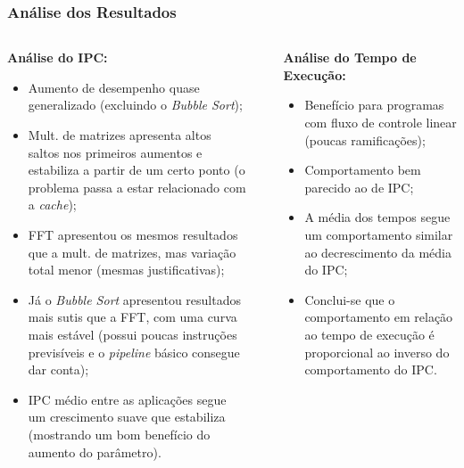 \documentclass{beamer}
\begin{document}
    \begin{frame}
        \frametitle{Análise dos Resultados}

        \begin{columns}
            \begin{column}{0.45\textwidth}
                \begin{center}
                    \large
                    \textbf{Análise do IPC:}
                \end{center}

                \begin{itemize}
                    \scriptsize
                    \justifying
                    \item Aumento de desempenho quase generalizado (excluindo o \textit{Bubble Sort});
                    \item Mult. de matrizes apresenta altos saltos nos primeiros aumentos e estabiliza a partir de um certo ponto (o problema passa a estar relacionado com a \textit{cache});
                    \item FFT apresentou os mesmos resultados que a mult. de matrizes, mas variação total menor (mesmas justificativas);
                    \item Já o \textit{Bubble Sort} apresentou resultados mais sutis que a FFT, com uma curva mais estável (possui poucas instruções previsíveis e o \textit{pipeline} básico consegue dar conta);
                    \item IPC médio entre as aplicações segue um crescimento suave que estabiliza (mostrando um bom benefício do aumento do parâmetro).
                \end{itemize}
            \end{column}

            \begin{column}{0.01\textwidth}
                \rule{.1mm}{0.875\textheight}
            \end{column}

            \begin{column}{0.45\textwidth}
                \begin{center}
                    \large
                    \textbf{Análise do Tempo de Execução:}
                \end{center}

                \begin{itemize}
                    \scriptsize
                    \justifying
                    \item Benefício para programas com fluxo de controle linear (poucas ramificações);
                    \item Comportamento bem parecido ao de IPC;
                    \item A média dos tempos segue um comportamento similar ao decrescimento da média do IPC;
                    \item Conclui-se que o comportamento em relação ao tempo de execução é proporcional ao inverso do comportamento do IPC.
                \end{itemize}
            \end{column}
        \end{columns}
    \end{frame}
\end{document}
